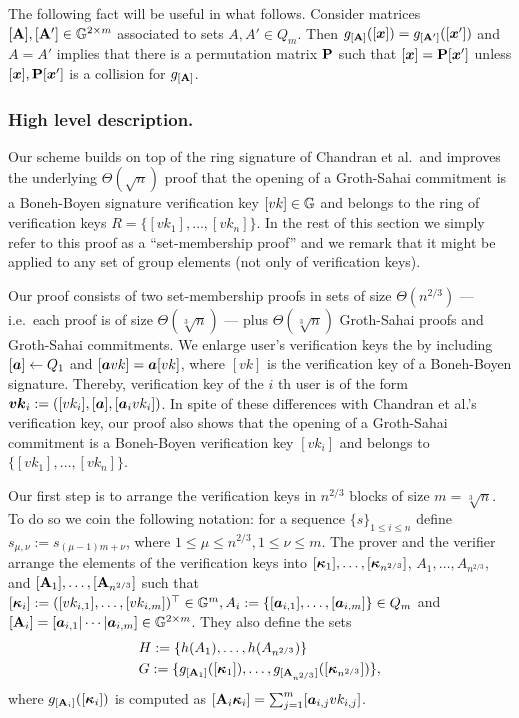 The following fact will be useful in what follows. Consider matrices $[\mathbf{{A}}],[\mathbf{{A}}']\in\mathbb{G}^{2\times m}$ associated to sets $A,A'\in Q_m$. Then $g_{[\mathbf{{A}}]}([{\boldsymbol{x}}]) = g_{[\mathbf{{A}}']}([{\boldsymbol{x}}'])$ and $A=A'$ implies that there is a permutation matrix $\mathbf{{P}}$ such that $[{\boldsymbol{x}}]=\mathbf{{P}}[{\boldsymbol{x}}']$ unless $[{\boldsymbol{x}}],\mathbf{{P}}[{\boldsymbol{x}}']$ is a collision for $g_{[\mathbf{{A}}]}$.

\subsubsection{High level description.}
Our scheme builds on top of the ring signature of Chandran et al.~and improves the underlying $\Theta(\sqrt{n})$ proof that the opening of a Groth-Sahai commitment is a Boneh-Boyen signature verification key $[vk]\in\mathbb{G}$ and belongs to the ring of verification keys $R=\{[vk_1],\ldots,[vk_n]\}$. In the rest of this section we simply refer to this proof as a ``set-membership proof'' and we remark that it might be applied to any set of group elements (not only of verification keys).

Our proof consists of two set-membership proofs in sets of size $\Theta(n^{2/3})$ --- i.e.~each proof is of size $\Theta(\sqrt[3]{n})$ ---  plus $\Theta(\sqrt[3]{n})$ Groth-Sahai proofs and Groth-Sahai commitments.
We enlarge user's verification keys the by including $[{\boldsymbol{a}}]\gets Q_1$ and $[{\boldsymbol{a}}vk]={\boldsymbol{a}}[vk]$, where $[vk]$ is the verification key of a Boneh-Boyen signature. Thereby, verification key of the $i$ th user is of the form ${\boldsymbol{vk}}_i:=([vk_i],[{\boldsymbol{a}}],[{\boldsymbol{a}}_ivk_i])$. In spite of these differences with Chandran et al.'s verification key, our proof also shows that the opening of a Groth-Sahai commitment is a Boneh-Boyen verification key $[vk_i]$ and belongs to $\{[vk_1],\ldots,[vk_n]\}$.

Our first step is to arrange the verification keys in $n^{2/3}$ blocks of size $m=\sqrt[3]{n}$. To do so we coin the following notation: for a sequence $\{s\}_{1\leq i \leq n}$ define $s_{\mu,\nu}:=s_{(\mu-1)m+\nu}$, where  $1\leq\mu\leq n^{2/3},1\leq \nu\leq m$.  The prover and the verifier arrange the elements of the verification keys into $[{\boldsymbol{\kappa}}_1],\ldots, [{\boldsymbol{\kappa}}_{n^{2/3}}]$, $A_1,\ldots, A_{n^{2/3}}$, and $[\mathbf{{A}}_1],\ldots, [\mathbf{{A}}_{n^{2/3}}]$ such that $[{\boldsymbol{\kappa}}_i]:= ([vk_{i,1}],\ldots,[vk_{i,m}])^\top\in\mathbb{G}^m, A_i:=\{[{\boldsymbol{a}}_{i,1}],\ldots,[{\boldsymbol{a}}_{i,m}]\}\in Q_m$ and $[\mathbf{{A}}_i]=[{\boldsymbol{a}}_{i,1}|\cdots|{\boldsymbol{a}}_{i,m}]\in\mathbb{G}^{2\times m}$. They also define the sets
\begin{align*}
&H:=\{h(A_1),\ldots,\allowbreak h(A_{n^{2/3}})\}\\
&G:=\{g_{[\mathbf{{A}}_1]}([{\boldsymbol{\kappa}}_1]),\allowbreak\ldots,g_{[\mathbf{{A}}_{n^{2/3}}]}([{\boldsymbol{\kappa}}_{n^{2/3}}])\},
\end{align*}
where $g_{[\mathbf{{A}}_i]}([{\boldsymbol{\kappa}}_i])$ is computed as $[\mathbf{{A}}_i{\boldsymbol{\kappa}}_i]=\sum_{j=1}^m [{\boldsymbol{a}}_{i,j}vk_{i,j}]$.

